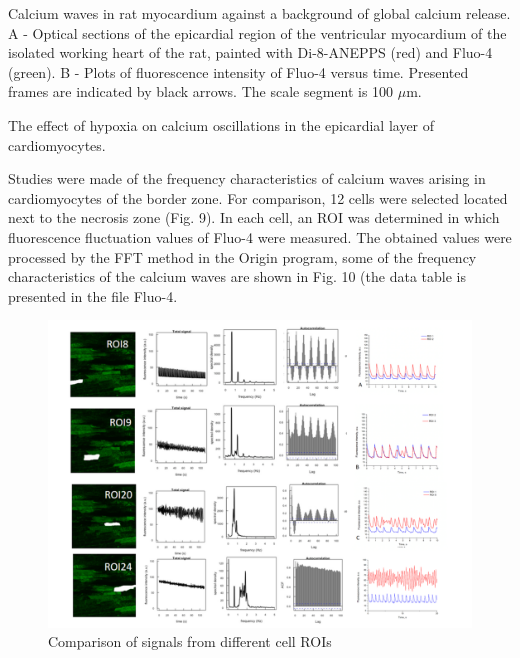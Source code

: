 \documentclass{biophys-new}
\begin{document}
Calcium waves in rat myocardium against a background of global calcium release. A - Optical sections of the epicardial region of the ventricular myocardium of the isolated working heart of the rat, painted with Di-8-ANEPPS (red) and Fluo-4 (green). B - Plots of fluorescence intensity of Fluo-4 versus time. Presented frames are indicated by black arrows. The scale segment is 100 $\mu$m.

The effect of hypoxia on calcium oscillations in the epicardial layer of cardiomyocytes.

Studies were made of the frequency characteristics of calcium waves arising in cardiomyocytes of the border zone. For comparison, 12 cells were selected located next to the necrosis zone (Fig. 9). In each cell, an ROI was determined in which fluorescence fluctuation values of Fluo-4 were measured. The obtained values were processed by the FFT method in the Origin program, some of the frequency characteristics of the calcium waves are shown in Fig. 10 (the data table is presented in the file Fluo-4.

\begin{figure}
    \includegraphics[width=0.9\linewidth]{fig5.png}
    \caption{Comparison of signals from different cell ROIs}
    \label{fig:fig5}
\end{figure}
\end{document}
